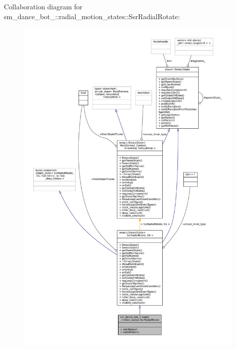 Collaboration diagram for sm\+\_\+dance\+\_\+bot\+\_\+:\+:radial\+\_\+motion\+\_\+states\+:\+:Ssr\+Radial\+Rotate\+:
\nopagebreak
\begin{figure}[H]
\begin{center}
\leavevmode
\includegraphics[width=350pt]{structsm__dance__bot__2_1_1radial__motion__states_1_1SsrRadialRotate__coll__graph}
\end{center}
\end{figure}
